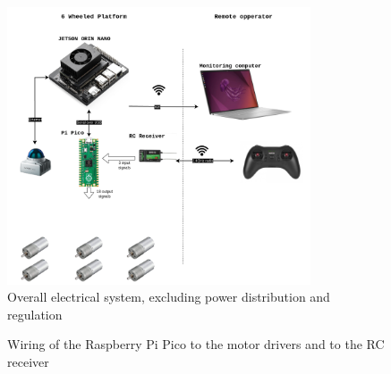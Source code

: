 \documentclass[12pt]{article}
\begin{document}
            \begin{figure}[H]
                \centering
                
                \includegraphics[width=0.8\textwidth]{Images/PFE-Page-2.drawio.png}
                \caption{Overall electrical system, excluding power distribution and regulation}
                \label{fig:overall_electical_system}
            \end{figure}


            
            
            \begin{figure}[h]
                \centering
                \mbox{}
                \caption{Wiring of the Raspberry Pi Pico to the motor drivers and to the RC receiver}
                \label{fig:driver_to_pico}
            \end{figure}
\end{document}
